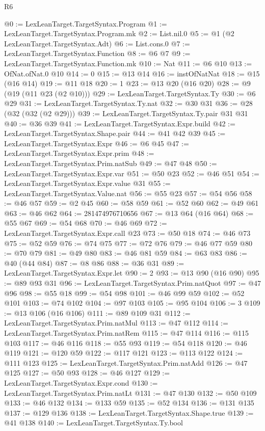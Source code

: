 \begin{lexlean}{R6}
\begin{coremodule}
@0 := LexLeanTarget.TargetSyntax.Program
@1 := LexLeanTarget.TargetSyntax.Program.mk
@2 := List.nil.{0}
@5 := @1 (@2 LexLeanTarget.TargetSyntax.Adt)
@6 := List.cons.{0}
@7 := LexLeanTarget.TargetSyntax.Function
@8 := @6 @7
@9 := LexLeanTarget.TargetSyntax.Function.mk
@10 := Nat
@11 := @6 @10
@13 := OfNat.ofNat.{0} @10
@14 := 0
@15 := @13 @14
@16 := instOfNatNat
@18 := @15 (@16 @14)
@19 := @11 @18
@20 := 1
@23 := @13 @20 (@16 @20)
@28 := @9 (@19 (@11 @23 (@2 @10)))
@29 := LexLeanTarget.TargetSyntax.Ty
@30 := @6 @29
@31 := LexLeanTarget.TargetSyntax.Ty.nat
@32 := @30 @31
@36 := @28 (@32 (@32 (@2 @29)))
@39 := LexLeanTarget.TargetSyntax.Ty.pair @31 @31
@40 := @36 @39
@41 := LexLeanTarget.TargetSyntax.Expr.build
@42 := LexLeanTarget.TargetSyntax.Shape.pair
@44 := @41 @42 @39
@45 := LexLeanTarget.TargetSyntax.Expr
@46 := @6 @45
@47 := LexLeanTarget.TargetSyntax.Expr.prim
@48 := LexLeanTarget.TargetSyntax.Prim.natSub
@49 := @47 @48
@50 := LexLeanTarget.TargetSyntax.Expr.var
@51 := @50 @23
@52 := @46 @51
@54 := LexLeanTarget.TargetSyntax.Expr.value @31
@55 := LexLeanTarget.TargetSyntax.Value.nat
@56 := @55 @23
@57 := @54 @56
@58 := @46 @57
@59 := @2 @45
@60 := @58 @59
@61 := @52 @60
@62 := @49 @61
@63 := @46 @62
@64 := 281474976710656
@67 := @13 @64 (@16 @64)
@68 := @55 @67
@69 := @54 @68
@70 := @46 @69
@72 := LexLeanTarget.TargetSyntax.Expr.call @23
@73 := @50 @18
@74 := @46 @73
@75 := @52 @59
@76 := @74 @75
@77 := @72 @76
@79 := @46 @77 @59
@80 := @70 @79
@81 := @49 @80
@83 := @46 @81 @59
@84 := @63 @83
@86 := @40 (@44 @84)
@87 := @8 @86
@88 := @36 @31
@89 := LexLeanTarget.TargetSyntax.Expr.let
@90 := 2
@93 := @13 @90 (@16 @90)
@95 := @89 @93 @31
@96 := LexLeanTarget.TargetSyntax.Prim.natQuot
@97 := @47 @96
@98 := @55 @18
@99 := @54 @98
@101 := @46 @99 @59
@102 := @52 @101
@103 := @74 @102
@104 := @97 @103
@105 := @95 @104
@106 := 3
@109 := @13 @106 (@16 @106)
@111 := @89 @109 @31
@112 := LexLeanTarget.TargetSyntax.Prim.natMul
@113 := @47 @112
@114 := LexLeanTarget.TargetSyntax.Prim.natRem
@115 := @47 @114
@116 := @115 @103
@117 := @46 @116
@118 := @55 @93
@119 := @54 @118
@120 := @46 @119
@121 := @120 @59
@122 := @117 @121
@123 := @113 @122
@124 := @111 @123
@125 := LexLeanTarget.TargetSyntax.Prim.natAdd
@126 := @47 @125
@127 := @50 @93
@128 := @46 @127
@129 := LexLeanTarget.TargetSyntax.Expr.cond
@130 := LexLeanTarget.TargetSyntax.Prim.natLt
@131 := @47 @130
@132 := @50 @109
@133 := @46 @132
@134 := @133 @59
@135 := @52 @134
@136 := @131 @135
@137 := @129 @136
@138 := LexLeanTarget.TargetSyntax.Shape.true
@139 := @41 @138
@140 := LexLeanTarget.TargetSyntax.Ty.bool

\end{coremodule}
\end{lexlean}
